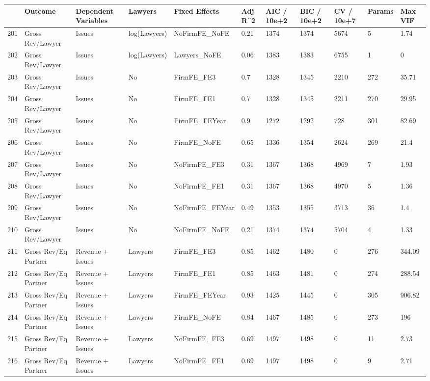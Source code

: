 \documentclass{article}
\begin{document}
\begin{table}[H]
\centering
\begin{tabular}{rllllllllll}
  \hline
 & Outcome & Dependent Variables & Lawyers & Fixed Effects & Adj R^2 & AIC / 10e+2 & BIC / 10e+2 & CV / 10e+7 & Params & Max VIF \\ 
  \hline
201 & Gross Rev/Lawyer & Issues & log(Lawyers) & NoFirmFE\_NoFE & 0.21 & 1374 & 1374 & 5674 & 5 & 1.74 \\ 
  202 & Gross Rev/Lawyer & Issues & log(Lawyers) & Lawyers\_NoFE & 0.06 & 1383 & 1383 & 6755 & 1 & 0 \\ 
  203 & Gross Rev/Lawyer & Issues & No & FirmFE\_FE3 & 0.7 & 1328 & 1345 & 2210 & 272 & 35.71 \\ 
  204 & Gross Rev/Lawyer & Issues & No & FirmFE\_FE1 & 0.7 & 1328 & 1345 & 2211 & 270 & 29.95 \\ 
  205 & Gross Rev/Lawyer & Issues & No & FirmFE\_FEYear & 0.9 & 1272 & 1292 & 728 & 301 & 82.69 \\ 
  206 & Gross Rev/Lawyer & Issues & No & FirmFE\_NoFE & 0.65 & 1336 & 1354 & 2624 & 269 & 21.4 \\ 
  207 & Gross Rev/Lawyer & Issues & No & NoFirmFE\_FE3 & 0.31 & 1367 & 1368 & 4969 & 7 & 1.93 \\ 
  208 & Gross Rev/Lawyer & Issues & No & NoFirmFE\_FE1 & 0.31 & 1367 & 1368 & 4970 & 5 & 1.36 \\ 
  209 & Gross Rev/Lawyer & Issues & No & NoFirmFE\_FEYear & 0.49 & 1353 & 1355 & 3713 & 36 & 1.4 \\ 
  210 & Gross Rev/Lawyer & Issues & No & NoFirmFE\_NoFE & 0.21 & 1374 & 1374 & 5704 & 4 & 1.33 \\ 
  211 & Gross Rev/Eq Partner & Revenue + Issues & Lawyers & FirmFE\_FE3 & 0.85 & 1462 & 1480 & 0 & 276 & 344.09 \\ 
  212 & Gross Rev/Eq Partner & Revenue + Issues & Lawyers & FirmFE\_FE1 & 0.85 & 1463 & 1481 & 0 & 274 & 288.54 \\ 
  213 & Gross Rev/Eq Partner & Revenue + Issues & Lawyers & FirmFE\_FEYear & 0.93 & 1425 & 1445 & 0 & 305 & 906.82 \\ 
  214 & Gross Rev/Eq Partner & Revenue + Issues & Lawyers & FirmFE\_NoFE & 0.84 & 1467 & 1485 & 0 & 273 & 196 \\ 
  215 & Gross Rev/Eq Partner & Revenue + Issues & Lawyers & NoFirmFE\_FE3 & 0.69 & 1497 & 1498 & 0 & 11 & 2.73 \\ 
  216 & Gross Rev/Eq Partner & Revenue + Issues & Lawyers & NoFirmFE\_FE1 & 0.69 & 1497 & 1498 & 0 & 9 & 2.71 \\ 

\end{tabular}
\end{table}
\end{document}
